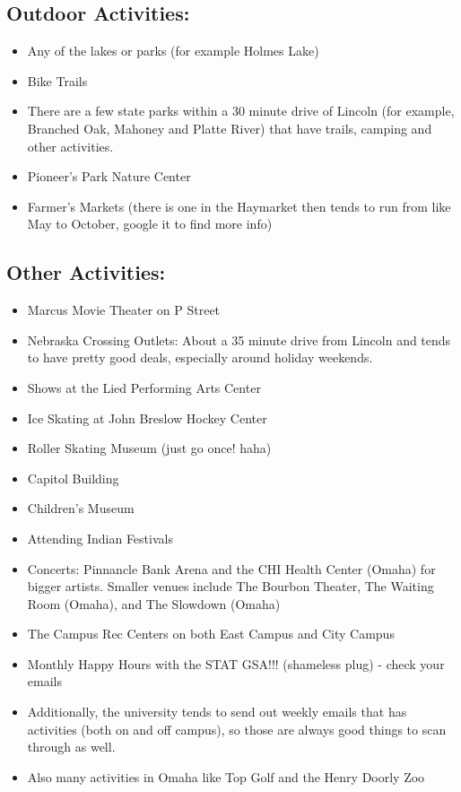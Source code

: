 \documentclass[
  12pt,
]{book}
\providecommand{\tightlist}{%
  \setlength{\itemsep}{0pt}\setlength{\parskip}{0pt}}
\begin{document}
\hypertarget{outdoor-activities}{%
\subsection{Outdoor Activities:}\label{outdoor-activities}}

\begin{itemize}
\tightlist
\item
  Any of the lakes or parks (for example Holmes Lake)
\item
  Bike Trails
\item
  There are a few state parks within a 30 minute drive of Lincoln (for example, Branched Oak, Mahoney and Platte River) that have trails, camping and other activities.
\item
  Pioneer's Park Nature Center
\item
  Farmer's Markets (there is one in the Haymarket then tends to run from like May to October, google it to find more info)
\end{itemize}

\hypertarget{other-activities}{%
\subsection{Other Activities:}\label{other-activities}}

\begin{itemize}
\tightlist
\item
  Marcus Movie Theater on P Street
\item
  Nebraska Crossing Outlets: About a 35 minute drive from Lincoln and tends to have pretty good deals, especially around holiday weekends.
\item
  Shows at the Lied Performing Arts Center
\item
  Ice Skating at John Breslow Hockey Center
\item
  Roller Skating Museum (just go once! haha)
\item
  Capitol Building
\item
  Children's Museum
\item
  Attending Indian Festivals
\item
  Concerts: Pinnancle Bank Arena and the CHI Health Center (Omaha) for bigger artists. Smaller venues include The Bourbon Theater, The Waiting Room (Omaha), and The Slowdown (Omaha)
\item
  The Campus Rec Centers on both East Campus and City Campus
\item
  Monthly Happy Hours with the STAT GSA!!! (shameless plug) - check your emails
\item
  Additionally, the university tends to send out weekly emails that has activities (both on and off campus), so those are always good things to scan through as well.
\item
  Also many activities in Omaha like Top Golf and the Henry Doorly Zoo
\end{itemize}
\end{document}
